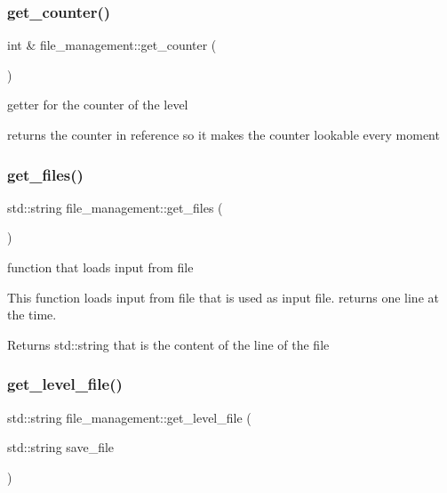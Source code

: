 \subsubsection{\texorpdfstring{get\+\_\+counter()}{get\_counter()}}
{\footnotesize\ttfamily int \& file\+\_\+management\+::get\+\_\+counter (\begin{DoxyParamCaption}{ }\end{DoxyParamCaption})}



getter for the counter of the level 

returns the counter in reference so it makes the counter lookable every moment \mbox{\label{classfile__management_a6c3f90ce958156adea878510097d64ef}} 
\subsubsection{\texorpdfstring{get\+\_\+files()}{get\_files()}}
{\footnotesize\ttfamily std\+::string file\+\_\+management\+::get\+\_\+files (\begin{DoxyParamCaption}{ }\end{DoxyParamCaption})}



function that loads input from file 

This function loads input from file that is used as input file. returns one line at the time.

\begin{DoxyReturn}{Returns}
std\+::string that is the content of the line of the file 
\end{DoxyReturn}
\mbox{\label{classfile__management_a58233800263bf74ae074a9a46f4a7bd0}} 
\subsubsection{\texorpdfstring{get\+\_\+level\+\_\+file()}{get\_level\_file()}}
{\footnotesize\ttfamily std\+::string file\+\_\+management\+::get\+\_\+level\+\_\+file (\begin{DoxyParamCaption}\item[{std\+::string}]{save\+\_\+file }\end{DoxyParamCaption})}



